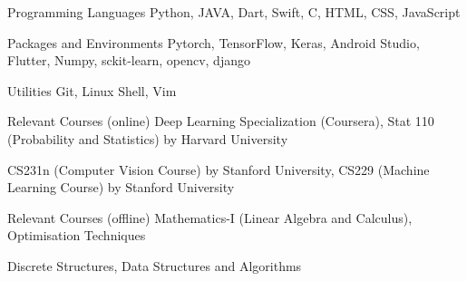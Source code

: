 

\begin{cvskills}

  \cvskill
    {Programming Languages} %
    {Python, JAVA, Dart, Swift, C, HTML, CSS, JavaScript} %

  \cvskill
    {Packages and Environments} %
    {Pytorch, TensorFlow, Keras, Android Studio, Flutter, Numpy, sckit-learn, opencv, django} %
    

  \cvskill
    {Utilities} %
    {Git, Linux Shell, Vim} %


  \cvskill
    {Relevant Courses (online)} %
    {Deep Learning Specialization (Coursera), Stat 110 (Probability and Statistics) by Harvard University} %
    
  \cvskill
  {}
  {CS231n (Computer Vision Course) by Stanford University, CS229 (Machine Learning Course) by Stanford University}

    
  \cvskill
    {Relevant Courses (offline)}
    {Mathematics-I (Linear Algebra and Calculus), Optimisation Techniques} 
    
  \cvskill
  {}
  {Discrete Structures, Data Structures and Algorithms}
\end{cvskills}
